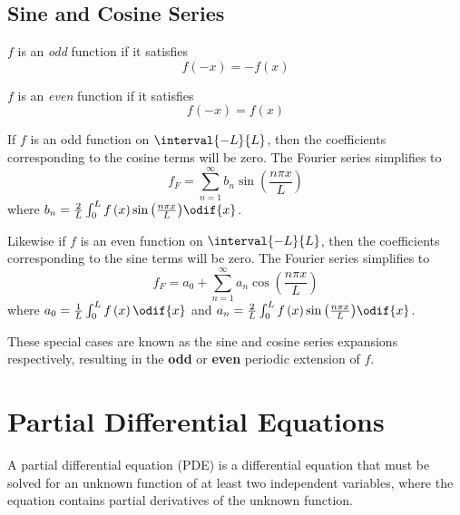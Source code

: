 \documentclass{article}
\begin{document}
\subsection{Sine and Cosine Series}
\begin{definition}
    \(f\) is an \textit{odd} function if it satisfies
    \begin{equation*}
        f\left( -x \right) = -f\left( x \right)
    \end{equation*}
\end{definition}
\begin{definition}
    \(f\) is an \textit{even} function if it satisfies
    \begin{equation*}
        f\left( -x \right) = f\left( x \right)
    \end{equation*}
\end{definition}
If \(f\) is an odd function on \(\interval{-L}{L}\), then the coefficients corresponding to the cosine terms will be zero.
The Fourier series simplifies to
\begin{equation*}
    f_F = \sum_{n = 1}^\infty b_n \sin{\left( \frac{n \pi x}{L} \right)}
\end{equation*}
where \(b_n = \frac{2}{L} \int_0^L f\left( x \right) \sin{\left( \frac{n \pi x}{L} \right)} \odif{x}\).

Likewise if \(f\) is an even function on \(\interval{-L}{L}\), then the coefficients corresponding to the sine terms will be zero.
The Fourier series simplifies to
\begin{equation*}
    f_F = a_0 + \sum_{n = 1}^\infty a_n \cos{\left( \frac{n \pi x}{L} \right)}
\end{equation*}
where \(a_0 = \frac{1}{L} \int_0^L f\left( x \right) \odif{x}\) and \(a_n = \frac{2}{L} \int_0^L f\left( x \right) \sin{\left( \frac{n \pi x}{L} \right)} \odif{x}\).

These special cases are known as the sine and cosine series expansions respectively, resulting in the \textbf{odd} or \textbf{even} periodic extension of \(f\).
\section{Partial Differential Equations}
A partial differential equation (PDE) is a differential equation that must be solved for an unknown function of at least two independent variables,
where the equation contains partial derivatives of the unknown function.
\end{document}
